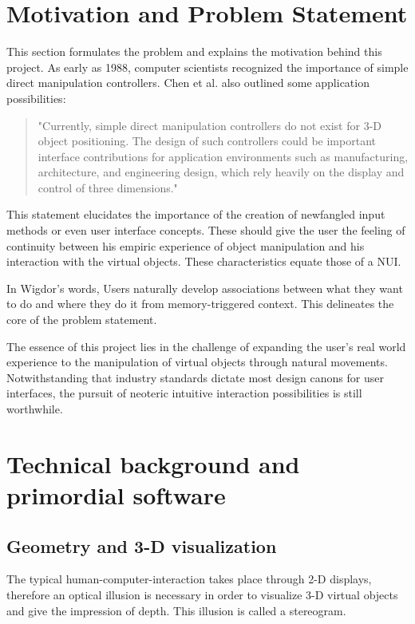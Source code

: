 \documentclass[12pt]{extarticle}
\begin{document}
\section{Motivation and Problem Statement}\label{sec:Mot}

This section formulates the problem and explains the motivation behind this project. As early as 1988, computer scientists recognized the importance of simple direct manipulation controllers. Chen et al. also outlined some application possibilities:
\begin{quotation}
"Currently, simple direct manipulation controllers do not exist for 3-D object positioning. The design of such controllers could be important interface contributions for application environments such as manufacturing, architecture, and engineering design, which rely heavily on the display and control of three dimensions." \cite{3Don2D88}
\end{quotation}

This statement elucidates the importance of the creation of newfangled input methods or even user interface concepts. These should give the user the feeling of continuity between his empiric experience of object manipulation and his interaction with the virtual objects. These characteristics equate those of a NUI.

In Wigdor's words, \cite{NUIWorld} Users naturally develop associations between what they want to do and where they do it from memory-triggered context. This delineates the core of the problem statement.

The essence of this project lies in the challenge of expanding the user's real world experience to the manipulation of virtual objects through natural movements. Notwithstanding that industry standards dictate most design canons for user interfaces, the pursuit of neoteric intuitive interaction possibilities is still worthwhile.

\section{Technical background and primordial software}\label{sec:AV}
\subsection {Geometry and 3-D visualization}\label{subsec: geo}
The typical human-computer-interaction takes place through 2-D displays, therefore an optical illusion is necessary in order to visualize 3-D virtual objects and give the impression of depth. This illusion is called a stereogram.
\end{document}
